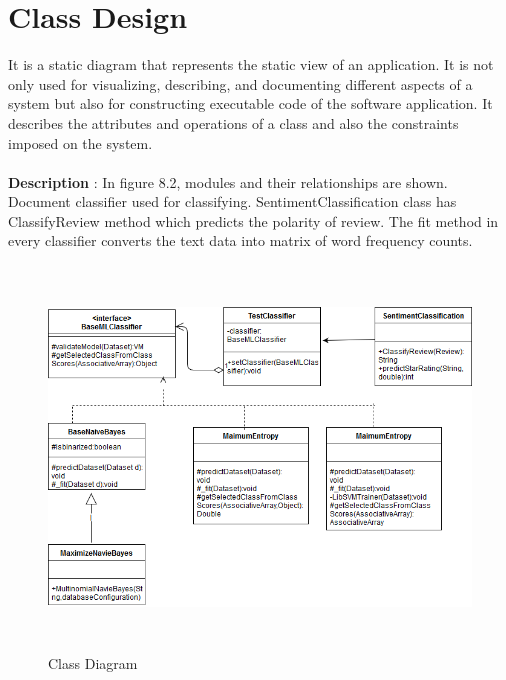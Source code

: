 \documentclass[oneside,a4paper,12pt]{pictreport}
\begin{document}
\section{Class Design}
It is a static diagram that represents the static view of an application. 
It is not only used for visualizing, describing, and documenting different
aspects of a system but also for constructing executable code of the software 
application. It describes the attributes and operations of a class and also
the constraints imposed on the system.
\\\\
\textbf{Description} : In figure 8.2, modules and their relationships are shown.
Document classifier used for classifying.
SentimentClassification class has ClassifyReview method which predicts the polarity of review.
The fit method in every classifier
converts the text data into matrix of word frequency counts.
\vspace{5mm}
\begin{figure}[h!]
\includegraphics[width=5.5in,height=4.0in]{class.png}
\caption{Class Diagram}
\end{figure}
\newpage
\end{document}
